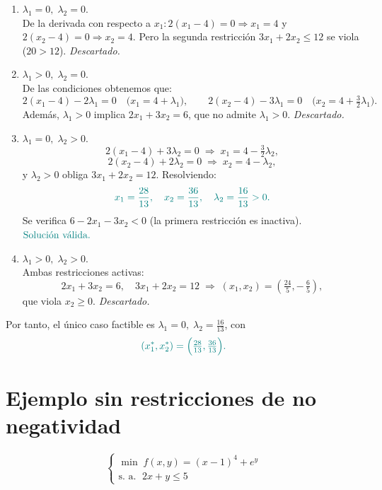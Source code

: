 \documentclass{article}
\begin{document}
\begin{enumerate}[label=\textbf{Caso \arabic*:}]
  \item \(\lambda_1=0,\;\lambda_2=0\).\\
    De la derivada con respecto a $x_1$\(:2(x_1-4)=0\Rightarrow x_1=4\) y  
    \(2(x_2-4)=0\Rightarrow x_2=4\).  
    Pero la segunda restricción \(3x_1+2x_2\le12\) se viola ($20>12$).  
    \emph{\color{teal}Descartado.}

  \item \(\lambda_1>0,\;\lambda_2=0\).\\
    De las condiciones obtenemos que:
    \[
      2(x_1-4)-2\lambda_1=0\quad\bigl(x_1=4+\lambda_1\bigr),\qquad
      2(x_2-4)-3\lambda_1=0\quad\bigl(x_2=4+\tfrac32\lambda_1\bigr).
    \]
    Además, \(\lambda_1>0\) implica \(2x_1+3x_2=6\), que no admite \(\lambda_1>0\).  
    \emph{\color{teal}Descartado.}

  \item \(\lambda_1=0,\;\lambda_2>0\).\\
    \[
     2(x_1-4)+3\lambda_2=0\;\Rightarrow\;x_1=4-\tfrac32\lambda_2,
    \]
    \[
     2(x_2-4)+2\lambda_2=0\;\Rightarrow\;x_2=4-\lambda_2,
    \]
    y \(\lambda_2>0\) obliga \(3x_1+2x_2=12\). Resolviendo:
    \[\color{teal}
      x_1=\frac{28}{13},\quad x_2=\frac{36}{13},\quad \lambda_2=\frac{16}{13}>0.
    \]
    Se verifica \(6-2x_1-3x_2<0\) (la primera restricción es inactiva).  
    \(\color{teal}{\text{\color{teal}Solución válida.}}\)

  \item \(\lambda_1>0,\;\lambda_2>0\).\\
    Ambas restricciones activas:
    \[
      2x_1+3x_2=6,\quad 3x_1+2x_2=12
      \;\Longrightarrow\;
      (x_1,x_2)=(\tfrac{24}{5},-\,\tfrac{6}{5}),
    \]
    que viola \(x_2\ge0\).  
    \emph{\color{teal}Descartado.}
\end{enumerate}

\noindent Por tanto, el único caso factible es \(\lambda_1=0,\;\lambda_2=\tfrac{16}{13}\), con  
\[\color{teal}
(x_1^*,x_2^*)=\Bigl(\tfrac{28}{13},\tfrac{36}{13}\Bigr).
\]


\section*{Ejemplo sin restricciones de no negatividad}


\[
\begin{cases}
\min\; f(x,y) = (x-1)^4 + e^{y} \\
\text{s. a. } \; 2x + y \leq 5
\end{cases}
\]
\end{document}
